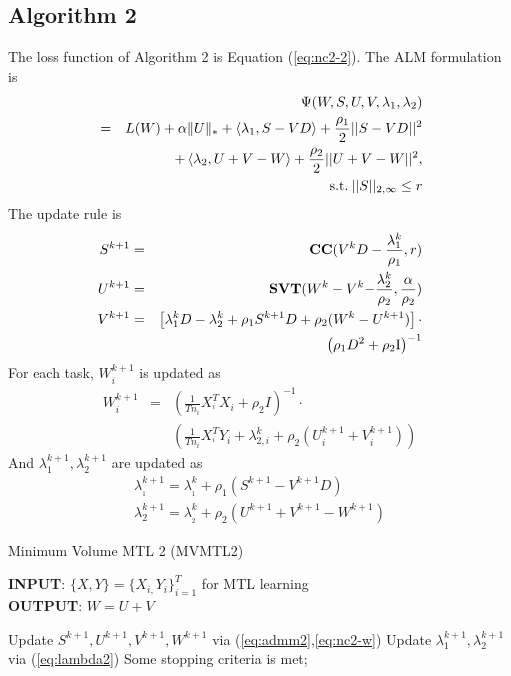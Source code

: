 \documentclass{article}
\newcounter{thm_counter}
\begin{document}
\subsection{Algorithm 2}

The loss function of Algorithm 2 is Equation (\ref{eq:nc2-2}). The ALM formulation is 
%
\begin{eqnarray}
\nonumber
&&{\Psi (W,S,U,V,{\lambda _1},{\lambda _2})}\\
\nonumber
&=& L(W)+\alpha\|U\|_{*}
+\left\langle {{\lambda_{1}},S-VD}\right\rangle  +\frac{{\rho_{1}}}{2}||S-VD|{|^{2}}\\
\nonumber
&& +\left\langle {{\lambda_{2}},U+V-W}\right\rangle +\frac{{\rho_{2}}}{2}||U+V-W|{|^{2}},\\
&& \:{\rm{s.t.}}\:||S|{|_{2,\infty}\leq r}
\label{eq:nc2-admm}
\end{eqnarray}
The update rule is
%
\begin{eqnarray}
\nonumber
{S^{k+1}} &=& {\rm {\textbf{CC}}}({V^k}D-\frac{{\lambda^k_{1}}}{{\rho_{1}}},r)\\
\nonumber
{U^{k+1}} &=& {\rm {\textbf{SVT}}}({W^{k}}-{V^{k}}{\rm {-}}\frac{{\lambda^k_{2}}}{{\rho_{2}}},\frac{\alpha}{{\rho_{2}}})\\
\nonumber
{V^{k+1}} &=& \left[{{\lambda^k_{1}}D-{\lambda^k_{2}}+{\rho_{1}}{S^{k+1}}D+{\rho_{2}}({W^{k}}-{U^{k+1}})}\right]\cdot \\
&&{\left({{\rho_{1}}{D^{2}}+{\rho_{2}}{\rm {I}}}\right)^{-1}}
\label{eq:admm2}
\end{eqnarray}
For each task, $W^{k + 1}_{i}$ is updated as
\begin{eqnarray}
\nonumber
W_{i}^{k+1}&=&{(\frac{1}{{T{n_{i}}}}X_{^{i}}^{T}{X_{i}}+{\rho_{2}}I)^{-1}}\cdot\\
&&\left(\frac{1}{{T{n_{i}}}}X_{^{i}}^{T}{Y_{i}}+{\lambda^k_{2,i}}+{\rho_{2}}(U_{i}^{k+1}+V_{i}^{k+1})\right)
\label{eq:nc2-w}
\end{eqnarray}
And ${\lambda^{k + 1}_{1}}, {\lambda^{k + 1}_{2}}$ are updated as
\begin{equation}
\begin{array}{*{20}{l}}
{\lambda _{_1}^{k + 1} = \lambda _{_1}^k + {\rho _1}({S^{k + 1}} - {V^{k + 1}}D)}\\
{\lambda _2^{k + 1} = \lambda _{_2}^k + {\rho _2}({U^{k + 1}} + {V^{k + 1}} - {W^{k + 1}})}
\end{array}
\label{eq:lambda2}
\end{equation}
%
%
\begin{algorithm}
\label{alg:mvmtl2}
\caption{Minimum Volume MTL 2 (MVMTL2) }
\textbf{INPUT}: $\{X,Y\}=\{X_{i,}Y_{i}\}_{i=1}^{T}$ for MTL learning\\
\textbf{OUTPUT}: $W=U+V$
\begin{algorithmic}[1]
\REPEAT
\STATE Update ${S^{k+1}},{U^{k+1}},{V^{k+1}},{W^{k+1}}$ via (\ref{eq:admm2},\ref{eq:nc2-w})
\STATE Update $\lambda^{k+1}_{1},\lambda^{k+1}_{2}$ via (\ref{eq:lambda2}) 
\UNTIL Some stopping criteria is met;
\end{algorithmic}
\end{algorithm}
\end{document}
